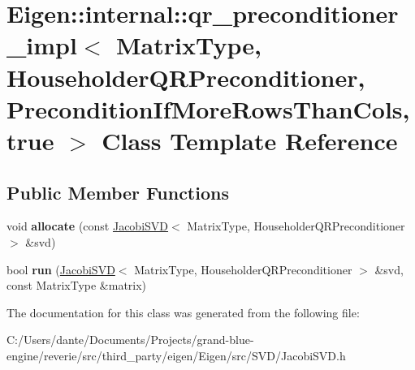 \hypertarget{class_eigen_1_1internal_1_1qr__preconditioner__impl_3_01_matrix_type_00_01_householder_q_r_preco3db9481bdea35fcb59961342158459cb}{}\section{Eigen\+::internal\+::qr\+\_\+preconditioner\+\_\+impl$<$ Matrix\+Type, Householder\+Q\+R\+Preconditioner, Precondition\+If\+More\+Rows\+Than\+Cols, true $>$ Class Template Reference}
\label{class_eigen_1_1internal_1_1qr__preconditioner__impl_3_01_matrix_type_00_01_householder_q_r_preco3db9481bdea35fcb59961342158459cb}
\subsection*{Public Member Functions}
\begin{DoxyCompactItemize}
\item 
\mbox{\label{class_eigen_1_1internal_1_1qr__preconditioner__impl_3_01_matrix_type_00_01_householder_q_r_preco3db9481bdea35fcb59961342158459cb_a6052eaee17d51283dc3251a0461f6177}} 
void {\bfseries allocate} (const \mbox{\hyperlink{class_eigen_1_1_jacobi_s_v_d}{Jacobi\+S\+VD}}$<$ Matrix\+Type, Householder\+Q\+R\+Preconditioner $>$ \&svd)
\item 
\mbox{\label{class_eigen_1_1internal_1_1qr__preconditioner__impl_3_01_matrix_type_00_01_householder_q_r_preco3db9481bdea35fcb59961342158459cb_a1c9bce19c400f97400e43b41a6e3255a}} 
bool {\bfseries run} (\mbox{\hyperlink{class_eigen_1_1_jacobi_s_v_d}{Jacobi\+S\+VD}}$<$ Matrix\+Type, Householder\+Q\+R\+Preconditioner $>$ \&svd, const Matrix\+Type \&matrix)
\end{DoxyCompactItemize}


The documentation for this class was generated from the following file\+:\begin{DoxyCompactItemize}
\item 
C\+:/\+Users/dante/\+Documents/\+Projects/grand-\/blue-\/engine/reverie/src/third\+\_\+party/eigen/\+Eigen/src/\+S\+V\+D/Jacobi\+S\+V\+D.\+h\end{DoxyCompactItemize}
